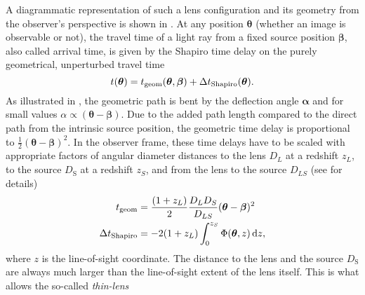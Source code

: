 A diagrammatic representation of such a lens configuration and its geometry from
the observer's perspective is shown in .  At any position
$\bm\theta$ (whether an image is observable or not), the travel time of a light
ray from a fixed source position $\bm\beta$, also called arrival time, is given
by the Shapiro time delay on the purely geometrical, unperturbed travel time
%
\begin{equation}\eqlbl{delay_components}%
  t(\bm\theta) = t_{\text{geom}}(\bm\theta, \bm\beta)
  + \Delta t_{\text{Shapiro}}(\bm\theta).
\end{equation}%
%
As illustrated in , the geometric path is bent by the
deflection angle $\bm\alpha$ and for small values $\alpha\propto(\bm\theta -
\bm\beta)$. Due to the added path length compared to the direct path from the
intrinsic source position, the geometric time delay is proportional to
$\frac{1}{2}(\bm\theta - \bm\beta)^{2}$.  In the observer frame, these time
delays have to be scaled with appropriate factors of angular diameter distances
to the lens $D_{L}$ at a redshift $z_{L}$, to the source $D_\mathrm{S}$ at a
redshift $z_{S}$, and from the lens to the source $D_{LS}$ (see
 for details)
%
%
\begin{equation}\eqlbl{geo_and_shapiro}%
  \begin{aligned}%
    t_{\text{geom}} &= \frac{(1+z_{L})}{2}\frac{D_{L}D_{S}}{D_{LS}}(\bm\theta - \bm\beta)^{2} \\
    \Delta t_{\text{Shapiro}} &= -2(1+z_{L})\int_{0}^{z_{S}}\Phi(\bm\theta, z)\,\mathrm{d}z,
  \end{aligned}%
\end{equation}%
%
where $z$ is the line-of-sight coordinate.  The distance to the lens and the
source $D_\mathrm{S}$ are always much larger than the line-of-sight extent of
the lens itself. This is what allows the so-called \textit{thin-lens}
